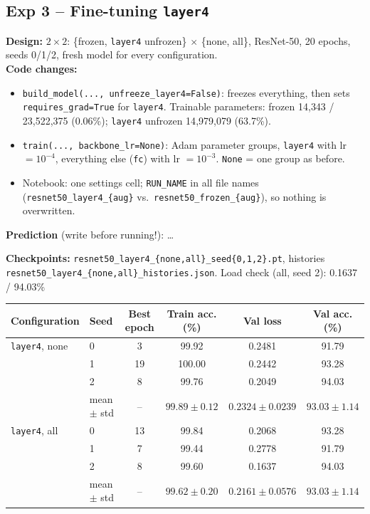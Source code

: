 \subsection*{Exp 3 -- Fine-tuning \texttt{layer4}}
\textbf{Design:} $2 \times 2$: \{frozen, \texttt{layer4} unfrozen\} $\times$ \{none, all\}, ResNet-50,
20 epochs, seeds 0/1/2, fresh model for every configuration.\\
\textbf{Code changes:}
\begin{itemize}
    \item \texttt{build\_model(..., unfreeze\_layer4=False)}: freezes everything, then sets
          \texttt{requires\_grad=True} for \texttt{layer4}.
          Trainable parameters: frozen 14{,}343 / 23{,}522{,}375 (0.06\%);
          \texttt{layer4} unfrozen 14{,}979{,}079 (63.7\%).
    \item \texttt{train(..., backbone\_lr=None)}: Adam parameter groups, \texttt{layer4} with
          lr $= 10^{-4}$, everything else (\texttt{fc}) with lr $= 10^{-3}$. \texttt{None} = one group as before.
    \item Notebook: one settings cell; \texttt{RUN\_NAME} in all file names
          (\texttt{resnet50\_layer4\_\{aug\}} vs.\ \texttt{resnet50\_frozen\_\{aug\}}), so nothing is overwritten.
\end{itemize}
\textbf{Prediction} (write before running!): \ldots

\textbf{Checkpoints:} \texttt{resnet50\_layer4\_\{none,all\}\_seed\{0,1,2\}.pt},
histories \texttt{resnet50\_layer4\_\{none,all\}\_histories.json}. Load check (all, seed 2): 0.1637 / 94.03\% \checkmark

\begin{center}
\begin{tabular}{llcccc}
    \toprule
    Configuration & Seed & Best epoch & Train acc. (\%) & Val loss & Val acc. (\%) \\
    \midrule
    \texttt{layer4}, none & 0 & 3  & 99.92  & 0.2481 & 91.79 \\
                          & 1 & 19 & 100.00 & 0.2442 & 93.28 \\
                          & 2 & 8  & 99.76  & 0.2049 & 94.03 \\
                          & mean $\pm$ std & -- & $99.89 \pm 0.12$ & $0.2324 \pm 0.0239$ & $93.03 \pm 1.14$ \\
    \midrule
    \texttt{layer4}, all  & 0 & 13 & 99.84  & 0.2068 & 93.28 \\
                          & 1 & 7  & 99.44  & 0.2778 & 91.79 \\
                          & 2 & 8  & 99.60  & 0.1637 & 94.03 \\
                          & mean $\pm$ std & -- & $99.62 \pm 0.20$ & $0.2161 \pm 0.0576$ & $93.03 \pm 1.14$ \\
    \bottomrule
\end{tabular}
\end{center}


